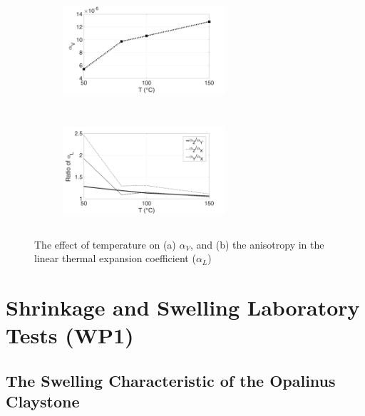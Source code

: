 \begin{figure}[!ht]
\centering
\begin{subfigure}[c]{0.48\textwidth}
\centering
\includegraphics[width=6cm,height=4cm]{figures/Amir_TrueTriaxial_MT_02_Result_1a.png}
\subcaption{}
\label{fig:Amir_TrueTriaxial_MT_02_Result_1a}
\end{subfigure}
\hfill
\begin{subfigure}[c]{0.48\textwidth}
\centering
\includegraphics[width=6cm,height=4cm]{figures/Amir_TrueTriaxial_MT_02_Result_1b.png}
\subcaption{}
\label{fig:Amir_TrueTriaxial_MT_02_Result_1b}
\end{subfigure}
\caption{The effect of temperature on (a) $\alpha_V$, and (b) the anisotropy in the linear thermal expansion coefficient ($\alpha_L$)}
\end{figure}


\section{Shrinkage and Swelling Laboratory Tests (WP1)}

\subsection{The Swelling Characteristic of the Opalinus Claystone}

